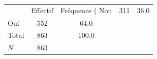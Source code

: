 {
\def\sym#1{\ifmmode^{#1}\else\(^{#1}\)\fi}
\begin{tabular}{l*{1}{cc}}
\toprule
            &    Effectif&Fréquence (%
\midrule
Non         &         311&        36.0\\
Oui         &         552&        64.0\\
Total       &         863&       100.0\\
\midrule
\(N\)       &         863&            \\
\bottomrule
\end{tabular}
}
